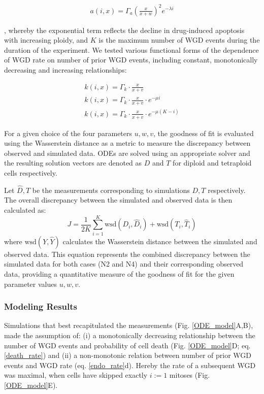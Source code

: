 \documentclass[11pt,notitlepage]{article}
\begin{document}
\begin{subequations}\label{death_rate}
\begin{align}
a(i, x) = \Gamma_a \left(\frac{x}{x + w}\right)^2 e^{-\lambda i}
\end{align}
\end{subequations}

, whereby the exponential term reflects the decline in drug-induced apoptosis with increasing ploidy, and $K$ is the maximum number of WGD events during the duration of the experiment. We tested various functional forms of the dependence of WGD rate on number of prior WGD events, including constant, monotonically decreasing and increasing relationships: 

\begin{subequations}\label{endo_rate}
\begin{align}
k(i, x) =  \Gamma_k \cdot \frac{{x}}{{x + v}} \\
k(i, x) =  \Gamma_k \cdot \frac{{x}}{{x + v}} \cdot e^{-\mu i} \\
k(i, x) =    \Gamma_k \cdot \frac{{x}}{{x + v}} \cdot e^{-\mu (K-i)}
\end{align}
\end{subequations}

For a given choice of the four parameters $u, w, v$, the goodness of fit is evaluated using the Wasserstein distance as a metric to measure the discrepancy between observed and simulated data. ODEs are solved using an appropriate solver and the resulting solution vectors are denoted as $D$ and $T$ for diploid and tetraploid cells respectively.

Let $\hat D, \hat T$ be the measurements corresponding to simulations $D, T$ respectively. The overall discrepancy between the simulated and observed data is then calculated as:
\[
J = \frac{1}{2K} \sum_{i=1}^{K} \text{wsd}(D_i, \hat D_i) + \text{wsd}(T_i, \hat T_i)
\]
where $\text{wsd}(Y, \hat Y)$ calculates the Wasserstein distance between the simulated and observed data. This equation represents the combined discrepancy between the simulated data for both cases (N2 and N4) and their corresponding observed data, providing a quantitative measure of the goodness of fit for the given parameter values $u, w, v$.


\subsubsection*{Modeling Results}

Simulations that best recapitulated the measurements (Fig. \ref{ODE_model}A,B), made the assumption of: (i) a monotonically decreasing relationship between the number of WGD events and probability of cell death (Fig. \ref{ODE_model}D; eq. \eqref{death_rate}) and (ii) a non-monotonic relation between number of prior WGD events and WGD rate (eq. \eqref{endo_rate}d). Hereby the rate of a subsequent WGD was maximal, when cells have skipped exactly $i:=1$ mitoses (Fig. \ref{ODE_model}E).
\end{document}
